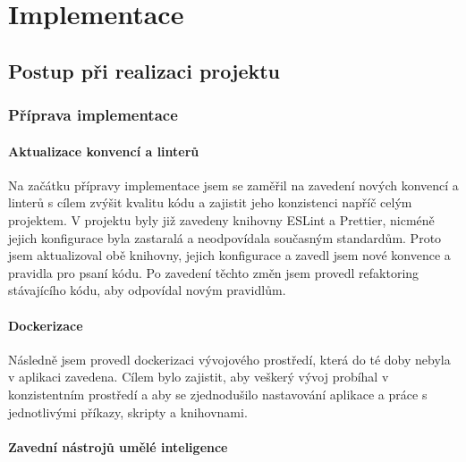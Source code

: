\chapter{Implementace}

\section{Postup při realizaci projektu}

\subsection{Příprava implementace}

\subsubsection{Aktualizace konvencí a linterů}

Na začátku přípravy implementace jsem se zaměřil na zavedení nových konvencí a linterů s cílem zvýšit kvalitu kódu a zajistit jeho konzistenci napříč celým projektem. V projektu byly již zavedeny knihovny ESLint a Prettier, nicméně jejich konfigurace byla zastaralá a neodpovídala současným standardům. Proto jsem aktualizoval obě knihovny, jejich konfigurace a zavedl jsem nové konvence a pravidla pro psaní kódu. Po zavedení těchto změn jsem provedl refaktoring stávajícího kódu, aby odpovídal novým pravidlům. 

\subsubsection{Dockerizace}

Následně jsem provedl dockerizaci vývojového prostředí, která do té doby nebyla v aplikaci zavedena. Cílem bylo zajistit, aby veškerý vývoj probíhal v konzistentním prostředí a aby se zjednodušilo nastavování aplikace a práce s jednotlivými příkazy, skripty a knihovnami.

\subsubsection{Zavední nástrojů umělé inteligence}



